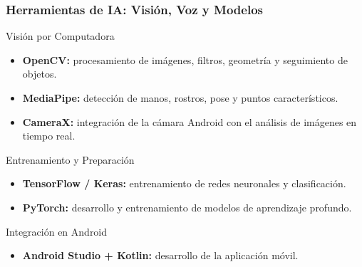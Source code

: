 \documentclass[aspectratio=169]{beamer}
\begin{document}
\begin{frame}
\frametitle{Herramientas de IA: Visión, Voz y Modelos}




\begin{block}{Visión por Computadora}
\begin{itemize}
    \item \textbf{OpenCV:} procesamiento de imágenes,
    filtros, geometría y seguimiento de objetos.

    \item \textbf{MediaPipe:} detección de manos,
    rostros, pose y puntos característicos.

    \item \textbf{CameraX:} integración de la cámara
    Android con el análisis de imágenes en tiempo real.
\end{itemize}
\end{block}






\begin{block}{Entrenamiento y Preparación}
\begin{itemize}
    \item \textbf{TensorFlow / Keras:}
    entrenamiento de redes neuronales y clasificación.

    \item \textbf{PyTorch:}
    desarrollo y entrenamiento de modelos de aprendizaje profundo.

\end{itemize}
\end{block}

\begin{block}{Integración en Android}
\begin{itemize}
    \item \textbf{Android Studio + Kotlin:}
    desarrollo de la aplicación móvil.


\end{itemize}
\end{block}
\end{frame}
\end{document}

